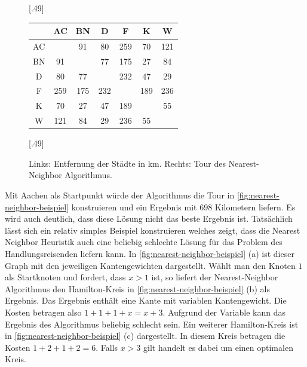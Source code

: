 \documentclass{article}
\begin{document}
\begin{figure}[h]
	\centering
	\subcaptionbox{\label{tbl:entfernungen-staedte}}[.49\linewidth]
	{
		\begin{tabular}{ |c|c|c|c|c|c|c| }
\hline
 & AC & BN & D& F & K & W \\ 
\hline
AC &  & 91 & 80 & 259 & 70 & 121 \\ 
\hline
BN & 91 &  & 77 & 175 & 27 & 84 \\ 
\hline
D & 80 & 77 &  & 232 & 47 & 29 \\ 
\hline
F & 259 & 175 & 232 &  & 189 & 236 \\ 
\hline
K & 70 & 27 & 47 & 189 &  & 55 \\ 
\hline
W & 121 & 84 & 29 & 236 & 55 &  \\ 
\hline
\end{tabular}
	}
	\subcaptionbox{\label{fig:nearest-neighbor-tour}}[.49\linewidth]
	{
	}
\caption{Links: Entfernung der Städte in km. Rechts: Tour des Nearest-Neighbor Algorithmus.}
\label{fig:nearest-neighbor-beispiel}
\end{figure}



Mit Aachen als Startpunkt würde der Algorithmus die Tour in \autoref{fig:nearest-neighbor-beispiel} konstruieren und ein Ergebnis mit 698 Kilometern liefern. Es wird auch deutlich, dass diese Lösung nicht das beste Ergebnis ist. Tatsächlich lässt sich ein relativ simples Beispiel konstruieren welches zeigt, dass die Nearest Neighbor Heuristik auch eine beliebig schlechte Lösung für das Problem des Handlungsreisenden liefern kann. In \autoref{fig:nearest-neighbor-beispiel} (a) ist dieser Graph mit den jeweiligen Kantengewichten dargestellt. Wählt man den Knoten $1$ als Startknoten und fordert, dass $x>1$ ist, so liefert der Nearest-Neighbor Algorithmus den Hamilton-Kreis in \autoref{fig:nearest-neighbor-beispiel} (b) als Ergebnis. Das Ergebnis enthält eine Kante mit variablen Kantengewicht. Die Kosten betragen also $1+1+1+x = x +3$. Aufgrund der Variable kann das Ergebnis des Algorithmus beliebig schlecht sein. Ein weiterer Hamilton-Kreis ist in \autoref{fig:nearest-neighbor-beispiel} (c) dargestellt. In diesem Kreis betragen die Kosten $1+2+1+2 = 6$.
Falls  $x>3$ gilt handelt es dabei um einen optimalen Kreis. 
\end{document}
